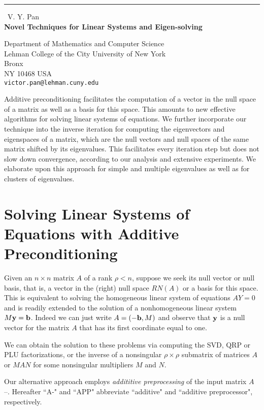 \documentclass{report}
\begin{document}
\begin{center}
\rule{6in}{1pt} \
{\large V. Y. Pan \\
{\bf Novel Techniques for Linear Systems and Eigen-solving}}

Department of Mathematics and Computer Science \\ Lehman College of the City University of New York \\ Bronx \\ NY 10468 USA
\\
{\tt victor.pan@lehman.cuny.edu}\end{center}

Additive preconditioning facilitates the computation of a vector in the
null space of a matrix as well as a basis for this space. This amounts to
new effective algorithms for solving linear systems of equations. We
further incorporate our technique into the inverse iteration for
computing the eigenvectors and eigenspaces of a matrix, which are the
null vectors and null spaces of the same matrix shifted by its
eigenvalues. This facilitates every iteration step but does not slow down
convergence, according to our analysis and extensive experiments.
We elaborate upon this approach for simple and multiple eigenvalues as
well as for clusters of eigenvalues.

\section{Solving Linear Systems of Equations with Additive Preconditioning}\label{s3ns}

Given an $n \times n$ matrix $A$ of a rank $\rho<n$, suppose we seek its
null vector or null basis, that is, a vector in the (right) null space
$RN(A)$ or a basis for this space. This is equivalent to solving the
homogeneous linear system of equations $AY=0$ and is readily extended to
the solution of a nonhomogeneous linear system $M{\bf y}={\bf b}$. Indeed
we can just write $A=(-{\bf b},M)$ and observe that ${\bf y}$ is a null
vector for the matrix $A$ that has its first coordinate equal to one.

We can obtain the solution to these problems via computing the SVD, QRP
or PLU factorizations, or the inverse of a nonsingular $\rho \times \rho$
submatrix of matrices $A$ or $MAN$ for some
nonsingular multipliers $M$ and $N$.

Our alternative approach employs {\em addititive preprocessing} of the
input matrix $A$ \cite{na}--\cite{eig}. Hereafter ``A-" and ``APP"
abbreviate ``additive" and ``additive preprocessor", respectively.
\end{document}
